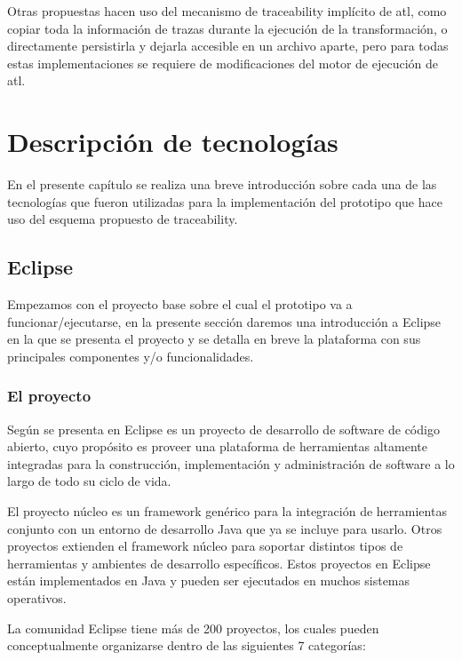 \documentclass[a4paper,12pt,oneside,spanish]{book}
\begin{document}
Otras propuestas hacen uso del mecanismo de traceability implícito de \gls{atl}, como copiar toda la información de trazas durante la ejecución de la transformación, o directamente persistirla y dejarla accesible en un archivo aparte, pero para todas estas implementaciones se requiere de modificaciones del motor de ejecución de \gls{atl}.



\chapter{Descripción de tecnologías}

En el presente capítulo se realiza una breve introducción sobre cada una de las tecnologías que fueron utilizadas para la implementación del prototipo que hace uso del esquema propuesto de traceability.


\section{Eclipse}

Empezamos con el proyecto base sobre el cual el prototipo va a funcionar/ejecutarse, en la presente sección daremos una introducción a Eclipse en la que se presenta el proyecto y se detalla en breve la plataforma con sus principales componentes y/o funcionalidades.


\subsection{El proyecto}

Según se presenta en \cite{EMFADG, Eclipse} Eclipse es un proyecto de desarrollo de software de código abierto, cuyo propósito es proveer una plataforma de herramientas altamente integradas para la construcción, implementación y administración de software a lo largo de todo su ciclo de vida.

El proyecto núcleo es un framework genérico para la integración de herramientas conjunto con un entorno de desarrollo Java que ya se incluye para usarlo. Otros proyectos extienden el framework núcleo para soportar distintos tipos de herramientas y ambientes de desarrollo específicos. Estos proyectos en Eclipse están implementados en Java y pueden ser ejecutados en muchos sistemas operativos.

La comunidad Eclipse tiene más de 200 proyectos, los cuales pueden conceptualmente organizarse dentro de las siguientes 7 categorías:
\end{document}
